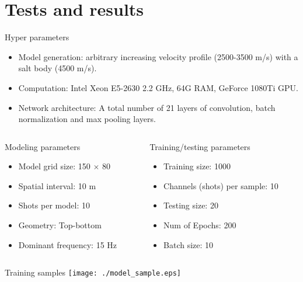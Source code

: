 \documentclass[aspectratio=169]{beamer}
\begin{document}
\section{Tests and results}
\begin{frame}{Hyper parameters}

\begin{itemize}
\item{Model generation: arbitrary increasing velocity profile (2500-3500 m/s) with a salt body (4500 m/s).}
\item{Computation: Intel Xeon E5-2630 2.2 GHz, 64G RAM, GeForce 1080Ti GPU.}
\item{Network architecture: A total number of 21 layers of convolution, batch normalization and max pooling layers.}
\end{itemize}

\begin{columns}
  \begin{column}{0.50\textwidth}
  \begin{block}{Modeling parameters}
    \begin{itemize}
    \item{Model grid size: 150 $\times$ 80}
    \item{Spatial interval: 10 m}
    \item{Shots per model: 10}
    \item{Geometry: Top-bottom}
    \item{Dominant frequency: 15 Hz}
    \end{itemize}
  \end{block}
  \end{column}
  \begin{column}{0.50\textwidth}
  \begin{block}{Training/testing parameters}
    \begin{itemize}
    \item{Training size: 1000}
    \item{Channels (shots) per sample: 10}
    \item{Testing size: 20}
    \item{Num of Epochs: 200}
    \item{Batch size: 10}
    \end{itemize}
  \end{block}
  \end{column}
\end{columns}
\end{frame}
\begin{frame}{Training samples}
    \texttt{[image: ./model\_sample.eps]}
\end{frame}
\end{document}
